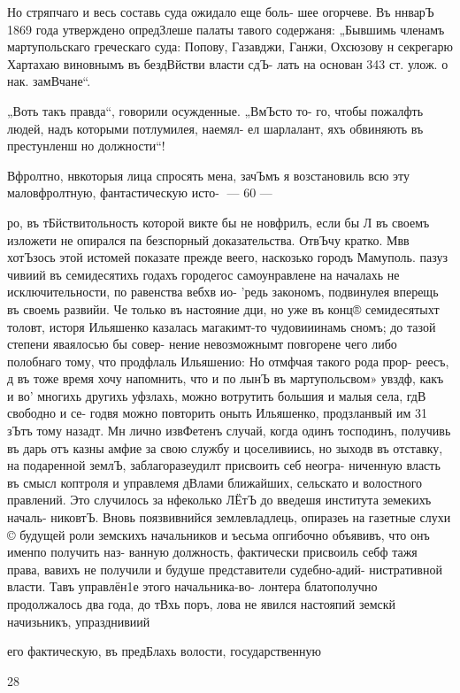 Но стряпчаго и весь составь суда ожидало еще боль-
шее огорчеве. Въ ннварЪ 1869 года утверждено опредЗлеше
палаты тавого содержаня: „Бывшимь членамъ мартупольскаго
греческаго суда: Попову, Газавджи, Ганжи, Охсюзову н
секрегарю Хартахаю виновнымъ въ бездВйстви власти сдЪ-
лать на основан 343 ст. улож. о нак. замВчане“.

„Воть такъ правда“, говорили осужденные. „ВмЪсто то-
го, чтобы пожалфть людей, надъ которыми потлумилея, наемял-
ел шарлалант, яхъ обвиняють въ престунленш но должности“!

Вфролтно, нвкоторыя лица спросять мена, зачЪмъ я
возстановиль всю эту маловфролтную, фантастическую исто-
— 60 —

ро, въ тБйствитольность которой викте бы не новфрилъ,
если бы Л въ своемъ изложети не опирался па безспорный
доказательства. ОтвЪчу кратко. Мвв хотЪзось этой истомей
показате прежде веего, наскозько городъ Мамуполь. пазуз
чивиий въ семидесятихь годахъ городегос самоунравлене
на началахь не исключительности, по равенства вебхв ио-
’редь закономъ, подвинулея вперещь въ своемь развийи. Че
только въ настояние дци, но уже въ конц® семидесятыхт
толовт, исторя Ильяшенко казалась ма гакимт-то
чудовииинамь сномъ; до тазой степени яваялосью бы совер-
нение невозможнымт повгорене чего либо полобнаго тому,
что продфлаль Ильяшенио: Но отмфчая такого рода прор-
реесъ, д въ тоже время хочу напомнить, что и по лынЪ въ
мартупольсвом» увздф, какъ и во’ многихь другихь уфзлахь,
можно вотрутить большия и малыя села, гдВ свободно и се-
годвя можно повторить оныть Ильяшенко, продзланвый им
31 зЪтъ тому назадт. Мн лично извФетенъ случай, когда
одинъ тосподинъ, получивь въ дарь отъ казны амфие за
свою службу и цоселивиись, но зыходв въ отставку, на
подаренной землЪ, заблагоразеудилт присвоить себ неогра-
ниченную власть въ смысл коптроля и управлемя дВлами
ближайших, сельскато и волостного правлений. Это случилось
за нфеколько ЛЁтЪ до введешя института земекихъ началь-
никовтЪ. Вновь поязвивнийся землевладлець, опиразеь на
газетные слухи © будущей роли земскихъ начальников и
ъесьма опгибочно объявивъ, что онъ именпо получить наз-
ванную должность, фактически присвоиль себф тажя права,
вавихъ не получили и будуше представители судебно-адий-
нистративной власти. Тавъ управлён1е этого начальника-во-
лонтера блатополучно продолжалось два года, до тВхь поръ,
лова не явился настояпий земскй начизьникъ, упразднивиий

его фактическую, въ предБлахь волости, государственную

28

